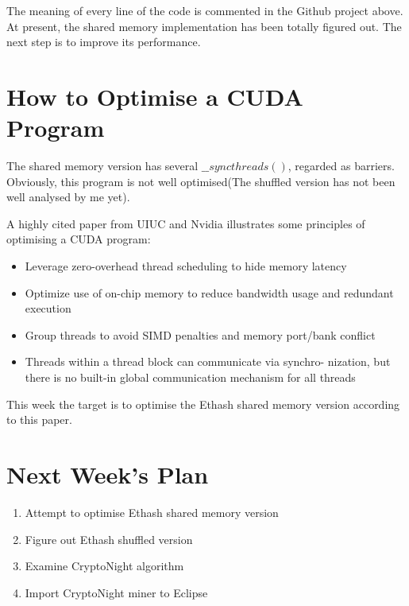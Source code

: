 \documentclass[11pt]{article}
\begin{document}
The meaning of every line of the code is commented in the Github project above. At present, the shared memory implementation has been totally figured out. The next step is to improve its performance.

\section{How to Optimise a CUDA Program}

The shared memory version has several $\_\_syncthreads()$, regarded as barriers. Obviously, this program is not well optimised(The shuffled version has not been well analysed by me yet).

A highly cited paper from UIUC and Nvidia\cite{ryoo2008optimization} illustrates some principles of optimising a CUDA program:

\begin{itemize}
\item Leverage zero-overhead thread scheduling to hide memory latency
\item Optimize use of on-chip memory to reduce bandwidth usage and redundant execution
\item Group threads to avoid SIMD penalties and memory port/bank conflict
\item Threads within a thread block can communicate via synchro- nization, but there is no built-in global communication mechanism for all threads
\end{itemize}

This week the target is to optimise the Ethash shared memory version according to this paper.

%
%
\section{Next Week's Plan}
\begin{enumerate}
\item Attempt to optimise Ethash shared memory version
\item Figure out Ethash shuffled version
\item Examine CryptoNight algorithm
\item Import CryptoNight miner to Eclipse
\end{enumerate}



\end{document}
